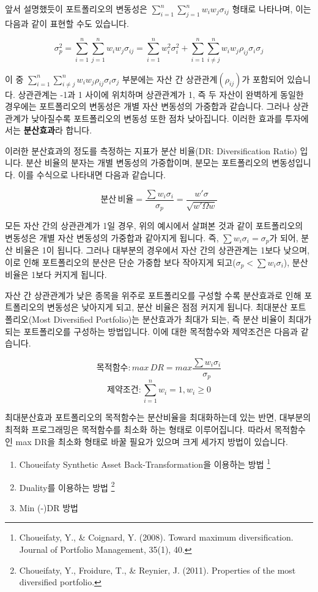 \documentclass[12pt,]{book}
\providecommand{\tightlist}{%
  \setlength{\itemsep}{0pt}\setlength{\parskip}{0pt}}
\let\rmarkdownfootnote\footnote%
\def\footnote{\protect\rmarkdownfootnote}
\begin{document}
앞서 설명했듯이 포트폴리오의 변동성은 \(\sum_{i=1}^{n}\sum_{j=1}^{n}w_iw_j\sigma_{ij}\) 형태로 나타나며, 이는 다음과 같이 표현할 수도 있습니다.

\[\sigma_p^2 = \sum_{i=1}^{n}\sum_{j=1}^{n}w_iw_j\sigma_{ij} = \sum_{i=1}^nw_i^2\sigma_i^2 +
\sum_{i=1}^{n}\sum_{i \ne j}^{n}w_iw_j\rho_{ij}\sigma_i\sigma_j \]

이 중 \(\sum_{i=1}^{n}\sum_{i \ne j}^{n}w_iw_j\rho_{ij}\sigma_i\sigma_j\) 부분에는 자산 간 상관관계\((\rho_{ij})\)가 포함되어 있습니다. 상관관계는 -1과 1 사이에 위치하며 상관관계가 1, 즉 두 자산이 완벽하게 동일한 경우에는 포트폴리오의 변동성은 개별 자산 변동성의 가중합과 같습니다. 그러나 상관관계가 낮아질수록 포트폴리오의 변동성 또한 점차 낮아집니다. 이러한 효과를 투자에서는 \textbf{분산효과}라 합니다.

이러한 분산효과의 정도를 측정하는 지표가 분산 비율(DR: Diversification Ratio) 입니다. 분산 비율의 분자는 개별 변동성의 가중합이며, 분모는 포트폴리오의 변동성입니다. 이를 수식으로 나타내면 다음과 같습니다.

\[ 분산\,비율 =  \frac{\sum w_i \sigma_i}{\sigma_p} = \frac{w'\sigma}{\sqrt{w'\Omega w}}\]

모든 자산 간의 상관관계가 1일 경우, 위의 예시에서 살펴본 것과 같이 포트폴리오의 변동성은 개별 자산 변동성의 가중합과 같아지게 됩니다. 즉, \(\sum w_i \sigma_i = \sigma_p\)가 되어, 분산 비율은 1이 됩니다. 그러나 대부분의 경우에서 자산 간의 상관관계는 1보다 낮으며, 이로 인해 포트폴리오의 분산은 단순 가중합 보다 작아지게 되고(\(\sigma_p < \sum w_i\sigma_i\)), 분산 비율은 1보다 커지게 됩니다.

자산 간 상관관계가 낮은 종목을 위주로 포트폴리오를 구성할 수록 분산효과로 인해 포트폴리오의 변동성은 낮아지게 되고, 분산 비율은 점점 커지게 됩니다. 최대분산 포트폴리오(Most Diversified Portfolio)는 분산효과가 최대가 되는, 즉 분산 비율이 최대가 되는 포트폴리오를 구성하는 방법입니다. 이에 대한 목적함수와 제약조건은 다음과 같습니다.

\[목적함수: max\,DR = max \frac{\sum w_i \sigma_i}{\sigma_p}\]
\[제약조건: \sum_{i=1}^n w_i = 1, w_i \ge 0\]

최대분산효과 포트폴리오의 목적함수는 분산비율을 최대화하는데 있는 반면, 대부분의 최적화 프로그래밍은 목적함수를 최소화 하는 형태로 이루어집니다. 따라서 목적함수인 max DR을 최소화 형태로 바꿀 필요가 있으며 크게 세가지 방법이 있습니다.

\begin{enumerate}
\def\labelenumi{\arabic{enumi}.}
\tightlist
\item
  Choueifaty Synthetic Asset Back-Transformation을 이용하는 방법 \footnote{Choueifaty, Y., \& Coignard, Y. (2008). Toward maximum diversification. Journal of Portfolio Management, 35(1), 40.}
\item
  Duality를 이용하는 방법 \footnote{Choueifaty, Y., Froidure, T., \& Reynier, J. (2011). Properties of the most diversified portfolio.}
\item
  Min (-)DR 방법
\end{enumerate}
\end{document}
